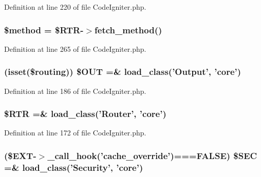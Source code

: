 Definition at line 220 of file Code\-Igniter.\-php.

\hypertarget{_code_igniter_8php_a12661b2fc0f57f97e30a1620889ce9c6}{
\subsubsection[{\$method}]{\setlength{\rightskip}{0pt plus 5cm}\$method = \$R\-T\-R-\/$>$fetch\-\_\-method()}}\label{_code_igniter_8php_a12661b2fc0f57f97e30a1620889ce9c6}


Definition at line 265 of file Code\-Igniter.\-php.

\hypertarget{_code_igniter_8php_a3f9ee241bf32c302b003449e028c859b}{
\subsubsection[{\$\-O\-U\-T}]{ (isset(\$routing)) \$O\-U\-T =\& load\-\_\-class('Output', 'core')}}\label{_code_igniter_8php_a3f9ee241bf32c302b003449e028c859b}


Definition at line 186 of file Code\-Igniter.\-php.

\hypertarget{_code_igniter_8php_a4d6c9285c8483e4708a57a4128fc95f3}{
\subsubsection[{\$\-R\-T\-R}]{\setlength{\rightskip}{0pt plus 5cm}\$R\-T\-R =\& load\-\_\-class('Router', 'core')}}\label{_code_igniter_8php_a4d6c9285c8483e4708a57a4128fc95f3}


Definition at line 172 of file Code\-Igniter.\-php.

\hypertarget{_code_igniter_8php_ad1366cae5e96fdde83a2fd6053334acd}{
\subsubsection[{\$\-S\-E\-C}]{ (\${\bf E\-X\-T}-\/$>$\-\_\-call\-\_\-hook('cache\-\_\-override')===F\-A\-L\-S\-E) \$S\-E\-C =\& load\-\_\-class('Security', 'core')}}\label{_code_igniter_8php_ad1366cae5e96fdde83a2fd6053334acd}


